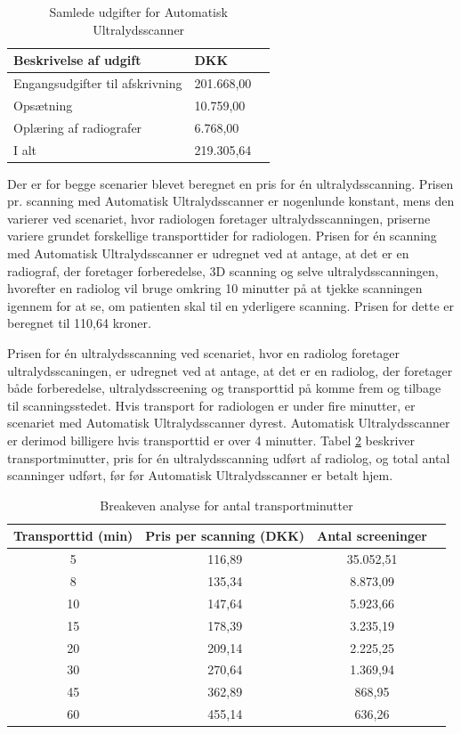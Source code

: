 \begin{table}[htb]
\centering
\begin{tabular}{ | l | l | p{} | }
\hline
\textbf{Beskrivelse af udgift} & \textbf{DKK} \\\hline
Engangsudgifter til afskrivning & 201.668,00 \\\hline
Opsætning & 10.759,00 \\\hline
Oplæring af radiografer & 6.768,00 \\\hline
I alt & 219.305,64 \\\hline
\end{tabular}
\caption{Samlede udgifter for Automatisk Ultralydsscanner}
\label{FasteOmkostninger}
\end{table}

Der er for begge scenarier blevet beregnet en pris for én ultralydsscanning. Prisen pr. scanning med Automatisk Ultralydsscanner er nogenlunde konstant, mens den varierer ved scenariet, hvor radiologen foretager ultralydsscanningen, priserne variere grundet forskellige transporttider for radiologen.  
Prisen for én scanning med Automatisk Ultralydsscanner er udregnet ved at antage, at det er en radiograf, der foretager forberedelse, 3D scanning og selve ultralydsscanningen, hvorefter en radiolog vil bruge omkring 10 minutter på at tjekke scanningen igennem for at se, om patienten skal til en yderligere scanning. Prisen for dette er beregnet til 110,64 kroner. 

Prisen for én ultralydsscanning ved scenariet, hvor en radiolog foretager ultralydsscaningen, er udregnet ved at antage, at det er en radiolog, der foretager både forberedelse, ultralydsscreening og transporttid på komme frem og tilbage til scanningsstedet. Hvis transport for radiologen er under fire minutter, er scenariet med Automatisk Ultralydsscanner dyrest. Automatisk Ultralydsscanner er derimod billigere hvis transporttid er over 4 minutter. Tabel \ref{Breakeven} beskriver transportminutter, pris for én ultralydsscanning udført af radiolog, og total antal scanninger udført, før før Automatisk Ultralydsscanner er betalt hjem. 

\begin{table}[H]
\centering
\begin{tabular}{ | c | c | c | p{} | }
\hline
\textbf{Transporttid (min)} & \textbf{Pris per scanning (DKK)} & \textbf{Antal screeninger} \\\hline
5 & 116,89 & 35.052,51 \\\hline
8 & 135,34 & 8.873,09\\\hline
10 & 147,64 & 5.923,66\\\hline
15 & 178,39 & 3.235,19 \\\hline
20 & 209,14 & 2.225,25\\\hline
30 & 270,64 & 1.369,94\\\hline
45 & 362,89 & 868,95 \\\hline
60 & 455,14 & 636,26 \\\hline
\end{tabular}
\caption{Breakeven analyse for antal transportminutter}
\label{Breakeven}
\end{table}

